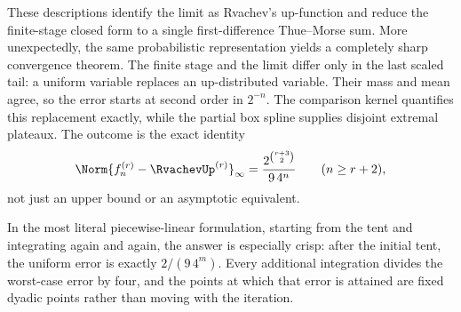 \documentclass[11pt,oneside]{article}
\theoremstyle{definition}
\theoremstyle{remark}
\begin{document}
These descriptions identify the limit as Rvachev's up-function and reduce the finite-stage
closed form to a single first-difference Thue--Morse sum.  More unexpectedly, the same
probabilistic representation yields a completely sharp convergence theorem.  The finite
stage and the limit differ only in the last scaled tail: a uniform variable replaces an
up-distributed variable.  Their mass and mean agree, so the error starts at second order in
$2^{-n}$.  The comparison kernel quantifies this replacement exactly, while the partial
box spline supplies disjoint extremal plateaux.  The outcome is the exact identity
\[
 \Norm{f_n^{(r)}-\RvachevUp^{(r)}}_\infty
 =\frac{2^{\binom{r+3}{2}}}{9\,4^n}
 \qquad(n\ge r+2),
\]
not just an upper bound or an asymptotic equivalent.

In the most literal piecewise-linear formulation, starting from the tent and integrating
again and again, the answer is especially crisp: after the initial tent, the uniform error
is exactly $2/(9\,4^m)$.  Every additional integration divides the worst-case error by four,
and the points at which that error is attained are fixed dyadic points rather than moving
with the iteration.
\end{document}
